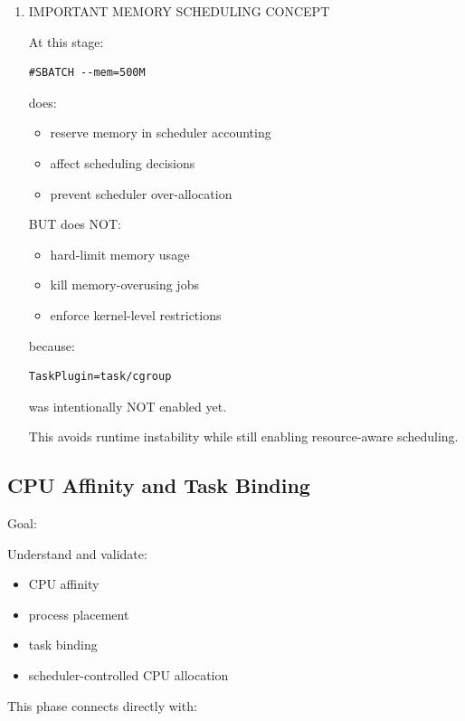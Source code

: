 \documentclass[11pt]{article}
\begin{document}
\begin{enumerate}
\begin{enumerate}
Production clusters always reserve memory for system operation.
\end{enumerate}
\item IMPORTANT MEMORY SCHEDULING CONCEPT
\label{sec:org2a63945}

At this stage:

\begin{verbatim}
#SBATCH --mem=500M
\end{verbatim}

does:

\begin{itemize}
\item reserve memory in scheduler accounting
\item affect scheduling decisions
\item prevent scheduler over-allocation
\end{itemize}

BUT does NOT:

\begin{itemize}
\item hard-limit memory usage
\item kill memory-overusing jobs
\item enforce kernel-level restrictions
\end{itemize}

because:

\begin{verbatim}
TaskPlugin=task/cgroup
\end{verbatim}

was intentionally NOT enabled yet.

This avoids runtime instability while still enabling resource-aware
scheduling.
\end{enumerate}
\subsection{CPU Affinity and Task Binding}
\label{sec:org5cadd9d}

Goal:

Understand and validate:

\begin{itemize}
\item CPU affinity
\item process placement
\item task binding
\item scheduler-controlled CPU allocation
\end{itemize}

This phase connects directly with:
\end{document}
